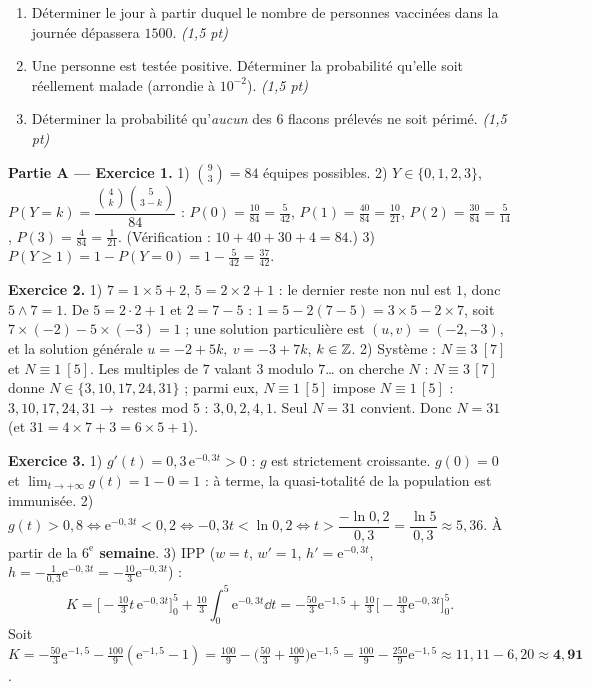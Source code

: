 \begin{enumerate}[label=\textbf{Tâche \arabic*.},leftmargin=2.4em]
\item Déterminer le jour à partir duquel le nombre de personnes vaccinées dans la journée
dépassera $1500$. \hfill\textit{(1,5 pt)}
\item Une personne est testée positive. Déterminer la probabilité qu'elle soit
réellement malade (arrondie à $10^{-2}$). \hfill\textit{(1,5 pt)}
\item Déterminer la probabilité qu'\emph{aucun} des $6$ flacons prélevés ne soit périmé. \hfill\textit{(1,5 pt)}
\end{enumerate}
\par{}


\noindent\textbf{Partie A — Exercice 1.}
1) $\binom{9}{3}=84$ équipes possibles.
2) $Y\in\{0,1,2,3\}$, $P(Y{=}k)=\dfrac{\binom4k\binom5{3-k}}{84}$ :
$P(0)=\frac{10}{84}=\frac5{42}$, $P(1)=\frac{40}{84}=\frac{10}{21}$,
$P(2)=\frac{30}{84}=\frac5{14}$, $P(3)=\frac{4}{84}=\frac1{21}$.
(Vérification : $10+40+30+4=84$.)
3) $P(Y\ge1)=1-P(Y{=}0)=1-\frac5{42}=\frac{37}{42}$.

\noindent\textbf{Exercice 2.}
1) $7=1\times5+2$, $5=2\times2+1$ : le dernier reste non nul est $1$, donc $5\wedge7=1$.
De $5=2\cdot2+1$ et $2=7-5$ : $1=5-2(7-5)=3\times5-2\times7$, soit $7\times(-2)-5\times(-3)=1$ ;
une solution particulière est $(u,v)=(-2,-3)$, et la solution générale
$u=-2+5k,\ v=-3+7k$, $k\in\mathbb{Z}$.
2) Système : $N\equiv3\ [7]$ et $N\equiv1\ [5]$. Les multiples de $7$ valant $3$ modulo $7$\dots
on cherche $N$ : $N\equiv3\,[7]$ donne $N\in\{3,10,17,24,31\}$ ; parmi eux, $N\equiv1\,[5]$
impose $N\equiv1\,[5]$ : $3,10,17,24,31\to$ restes mod $5$ : $3,0,2,4,1$. Seul $N=31$ convient.
Donc $\boxed{N=31}$ (et $31=4\times7+3=6\times5+1$).

\noindent\textbf{Exercice 3.}
1) $g'(t)=0{,}3\,\mathrm{e}^{-0{,}3t}>0$ : $g$ est strictement croissante. $g(0)=0$ et
$\lim_{t\to+\infty}g(t)=1-0=1$ : à terme, la quasi-totalité de la population est immunisée.
2) $g(t)>0{,}8\iff\mathrm{e}^{-0{,}3t}<0{,}2\iff-0{,}3t<\ln0{,}2\iff t>\dfrac{-\ln0{,}2}{0{,}3}=\dfrac{\ln5}{0{,}3}\approx5{,}36$.
À partir de la \textbf{$6^{\mathrm e}$ semaine}.
3) IPP ($w=t$, $w'=1$, $h'=\mathrm{e}^{-0{,}3t}$, $h=-\frac1{0{,}3}\mathrm{e}^{-0{,}3t}=-\frac{10}{3}\mathrm{e}^{-0{,}3t}$) :
\[K=\Big[-\tfrac{10}{3}t\,\mathrm{e}^{-0{,}3t}\Big]_0^5+\tfrac{10}{3}\int_0^5\mathrm{e}^{-0{,}3t}\dd t
=-\tfrac{50}{3}\mathrm{e}^{-1{,}5}+\tfrac{10}{3}\Big[-\tfrac{10}{3}\mathrm{e}^{-0{,}3t}\Big]_0^5.\]
Soit $K=-\frac{50}{3}\mathrm{e}^{-1{,}5}-\frac{100}{9}(\mathrm{e}^{-1{,}5}-1)
=\frac{100}{9}-\Big(\frac{50}{3}+\frac{100}{9}\Big)\mathrm{e}^{-1{,}5}
=\frac{100}{9}-\frac{250}{9}\mathrm{e}^{-1{,}5}\approx11{,}11-6{,}20\approx\mathbf{4{,}91}$.

